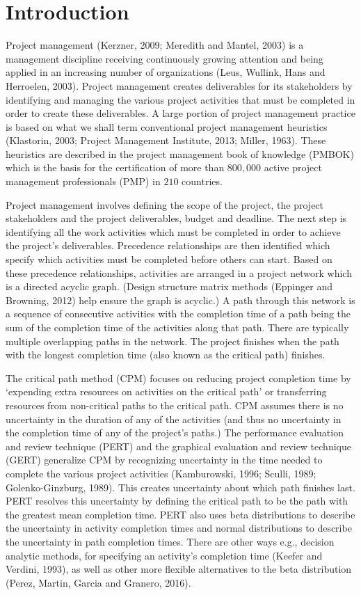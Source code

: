 \documentclass[11pt]{article}
\begin{document}
\section {Introduction}
         Project management (Kerzner, 2009; Meredith and Mantel, 2003) is a management discipline receiving continuously growing attention and being applied in an increasing number of organizations (Leus, Wullink, Hans and Herroelen, 2003).  Project management creates deliverables for its stakeholders by identifying and managing the various project activities that must be completed in order to create these deliverables.   A large portion of project management practice is based on what we shall term conventional project management heuristics (Klastorin, 2003; Project Management Institute, 2013; Miller, 1963).  These heuristics are described in the project management book of knowledge (PMBOK) which is the basis for the certification of more than $800,000$  active project management professionals (PMP) in $210$ countries. \par 
         Project management involves defining the scope of the project, the project stakeholders and the project deliverables, budget and deadline. The next step is identifying all the work activities which must be completed in order to achieve the project's deliverables.  Precedence relationships are then identified which specify which activities must be completed before others can start.    Based on these precedence relationships, activities are arranged in a project network which is a directed acyclic graph. (Design structure matrix methods (Eppinger and Browning, 2012) help ensure the graph is acyclic.)  A path through this network is a sequence of consecutive activities with the completion time of a path being the sum of the completion time of the activities along that path.  There are typically multiple overlapping paths in the network. The project finishes when the path with the longest completion time (also known as the critical path) finishes. \par The critical path method (CPM) focuses on reducing project completion time by `expending extra resources on activities on the critical path' or transferring resources from non-critical paths to the critical path.  CPM assumes there is no uncertainty in the duration of any of the activities (and thus no uncertainty in the completion time of any of the project's paths.)  The performance evaluation and review technique (PERT) and the graphical evaluation and review technique (GERT) generalize CPM by recognizing uncertainty in the time needed to complete the various project activities (Kamburowski, 1996; Sculli, 1989; Golenko-Ginzburg, 1989). This creates uncertainty about which path finishes last.   PERT resolves this uncertainty by defining the critical path to be the path with the greatest mean completion time. PERT also uses beta distributions to describe the uncertainty in activity completion times and normal distributions to describe the uncertainty in path completion times.  There are other ways e.g., decision analytic methods, for specifying an activity's completion time (Keefer and Verdini, 1993), as well as other more flexible alternatives to the beta distribution (Perez, Martin, Garcia and Granero, 2016).
\end{document}
